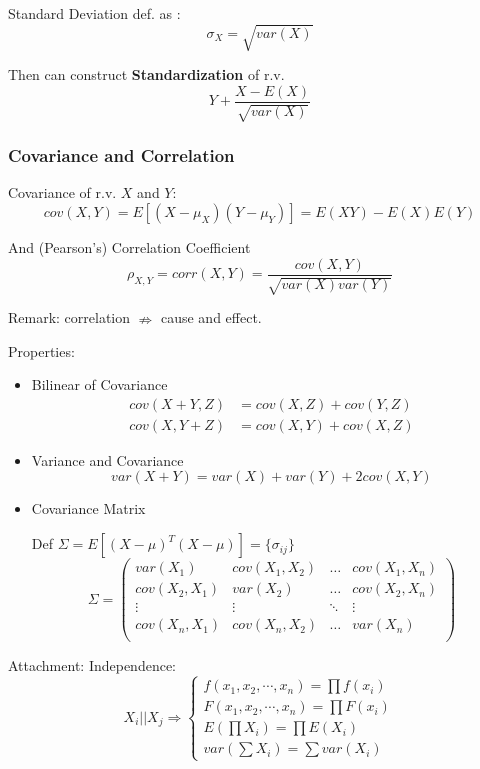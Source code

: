     Standard Deviation def. as :
    \[\sigma_X=\sqrt{var(X)}\]

    Then can construct \textbf{Standardization} of r.v.
    \[Y+\frac{X-E(X)}{\sqrt{var(X)}}\]


\subsubsection{Covariance and Correlation}
    Covariance of r.v. $X$ and $Y$:\[
        cov(X,Y)=E[(X-\mu_X)(Y-\mu_Y)]=E(XY)-E(X)E(Y)
    \]

    And (Pearson's) Correlation Coefficient\[
        \rho_{X,Y}=corr(X,Y)=\frac{cov(X,Y)}{\sqrt{var(X)var(Y)}}
    \]

    Remark: correlation $\nRightarrow$ cause and effect.

    Properties:
\begin{itemize}
\item Bilinear of Covariance\begin{align*}
    cov(X+Y,Z)&=cov(X,Z)+cov(Y,Z)\\
    cov(X,Y+Z)&=cov(X,Y)+cov(X,Z)
\end{align*}
    
\item Variance and Covariance\[
    var(X+Y)=var(X)+var(Y)+2cov(X,Y)
\]
\item Covariance Matrix

    Def $\Sigma=E[(X-\mu)^T(X-\mu)]=\{\sigma_{ij}\}$
\begin{equation}\label{covariancematrix}
    \Sigma=
        \begin{pmatrix}
        var(X_1) & cov(X_1,X_2) & \ldots & cov(X_1,X_n)\\
        cov(X_2,X_1) & var(X_2) & \ldots & cov(X_2,X_n)\\
        \vdots & \vdots & \ddots & \vdots\\
        cov(X_n,X_1) & cov(X_n,X_2) & \ldots & var(X_n)\\
        \end{pmatrix}    
    \end{equation}
\end{itemize}

Attachment: Independence:\[
    X_i || X_j\Rightarrow \begin{cases}
        f(x_1,x_2,\cdots,x_n)=\prod f(x_i)\\
        F(x_1,x_2,\cdots,x_n)=\prod F(x_i)\\
        E(\prod X_i)=\prod E(X_i)\\
        var(\sum X_i)=\sum var(X_i)
    \end{cases}
\]


